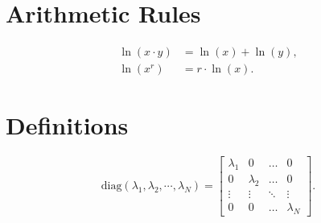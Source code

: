 \section*{Arithmetic Rules}
\begin{align}
\label{eq:log-sum}
\ln(x\cdot y)&=\ln(x)+\ln(y),\\
\label{eq:log-power}
\ln(x^r)&=r\cdot\ln(x).
\end{align}

\section*{Definitions}
\begin{equation}
    \text{diag}(\lambda_1, \lambda_2, \cdots, \lambda_N)=
    \begin{bmatrix}
    \lambda_1 &     0     & \dots  & 0 \\
       0      & \lambda_2 & \dots  & 0 \\
       \vdots &     \vdots     & \ddots & \vdots\\
    0         &     0     & \dots  &  \lambda_N
\end{bmatrix}.    
\end{equation}